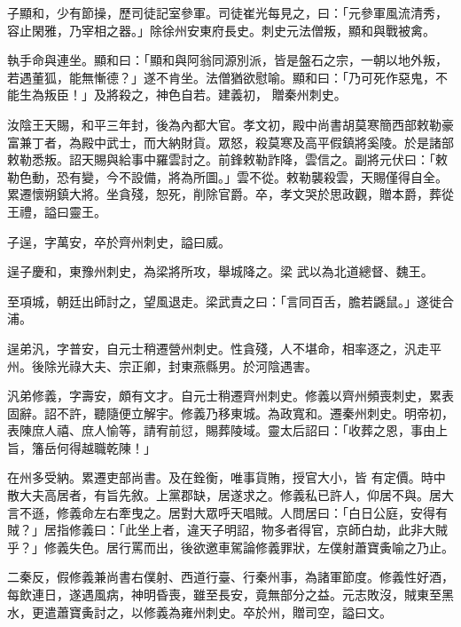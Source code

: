 \begin{pinyinscope}
 子顯和，少有節操，歷司徒記室參軍。司徒崔光每見之，曰：「元參軍風流清秀，容止閑雅，乃宰相之器。」除徐州安東府長史。刺史元法僧叛，顯和與戰被禽。



 執手命與連坐。顯和曰：「顯和與阿翁同源別派，皆是盤石之宗，一朝以地外叛，若遇董狐，能無慚德？」遂不肯坐。法僧猶欲慰喻。顯和曰：「乃可死作惡鬼，不能生為叛臣！」及將殺之，神色自若。建義初，
 贈秦州刺史。



 汝陰王天賜，和平三年封，後為內都大官。孝文初，殿中尚書胡莫寒簡西部敕勒豪富兼丁者，為殿中武士，而大納財貨。眾怒，殺莫寒及高平假鎮將奚陵。於是諸部敕勒悉叛。詔天賜與給事中羅雲討之。前鋒敕勒詐降，雲信之。副將元伏曰：「敕勒色動，恐有變，今不設備，將為所圖。」雲不從。敕勒襲殺雲，天賜僅得自全。累遷懷朔鎮大將。坐貪殘，恕死，削除官爵。卒，孝文哭於思政觀，贈本爵，葬從王禮，謚曰靈王。



 子逞，字萬安，卒於齊州刺史，謚曰威。



 逞子慶和，東豫州刺史，為梁將所攻，舉城降之。梁
 武以為北道總督、魏王。



 至項城，朝廷出師討之，望風退走。梁武責之曰：「言同百舌，膽若鼷鼠。」遂徙合浦。



 逞弟汎，字普安，自元士稍遷營州刺史。性貪殘，人不堪命，相率逐之，汎走平州。後除光祿大夫、宗正卿，封東燕縣男。於河陰遇害。



 汎弟修義，字壽安，頗有文才。自元士稍遷齊州刺史。修義以齊州頻喪刺史，累表固辭。詔不許，聽隨便立解宇。修義乃移東城。為政寬和。遷秦州刺史。明帝初，表陳庶人禧、庶人愉等，請宥前愆，賜葬陵域。靈太后詔曰：「收葬之恩，事由上旨，籓岳何得越職乾陳！」



 在州多受納。累遷吏部尚書。及在銓衡，唯事貨賄，授官大小，皆
 有定價。時中散大夫高居者，有旨先敘。上黨郡缺，居遂求之。修義私已許人，仰居不與。居大言不遜，修義命左右牽曳之。居對大眾呼天唱賊。人問居曰：「白日公庭，安得有賊？」居指修義曰：「此坐上者，違天子明詔，物多者得官，京師白劫，此非大賊乎？」修義失色。居行罵而出，後欲邀車駕論修義罪狀，左僕射蕭寶夤喻之乃止。



 二秦反，假修義兼尚書右僕射、西道行臺、行秦州事，為諸軍節度。修義性好酒，每飲連日，遂遇風病，神明昏喪，雖至長安，竟無部分之益。元志敗沒，賊東至黑水，更遣蕭寶夤討之，以修義為雍州刺史。卒於州，贈司空，謚曰文。




\end{pinyinscope}
